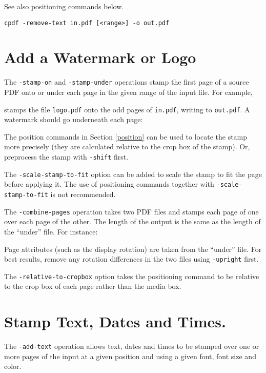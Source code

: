 \documentclass{book}
\begin{document}
{{  \noindent See also positioning commands below.

  \vspace{1.5mm}
  \noindent\small\texttt{cpdf -remove-text in.pdf [<range>] -o out.pdf}
  }}
\section{Add a Watermark or Logo}
  The \texttt{-stamp-on} and \texttt{-stamp-under} operations stamp the first
page of a source PDF onto or under each page in the given range of the input
file. For example,

\noindent{}
\noindent stamps the file \texttt{logo.pdf} onto the odd pages of \texttt{in.pdf},
writing to \texttt{out.pdf}. A watermark should go underneath each page:

\noindent{}


\noindent The position commands in Section \ref{position} can be used to locate the stamp more precisely (they are calculated relative to the crop box of the stamp). Or, preprocess the stamp with \texttt{-shift} first.

The \texttt{-scale-stamp-to-fit} option can be added to scale the stamp to fit the page before applying it. The use of positioning commands together with \texttt{-scale-stamp-to-fit} is not recommended.

  The \texttt{-combine-pages} operation takes two PDF files and stamps each
page of one over each page of the other. The length of the output is the same
as the length of the ``under'' file. For instance:

\noindent{}

\noindent Page attributes (such as the display rotation) are taken from the ``under''
file. For best results, remove any rotation differences in the two files using
\texttt{-upright} first.

\noindent The \texttt{-relative-to-cropbox} option takes the positioning command to be relative to the crop box of each page rather than the media box.



  \section{Stamp Text, Dates and Times.}
  The \texttt{-add-text} operation allows text, dates and times to be stamped
over one or more pages of the input at a given position and using a given font,
font size and color.
\end{document}
